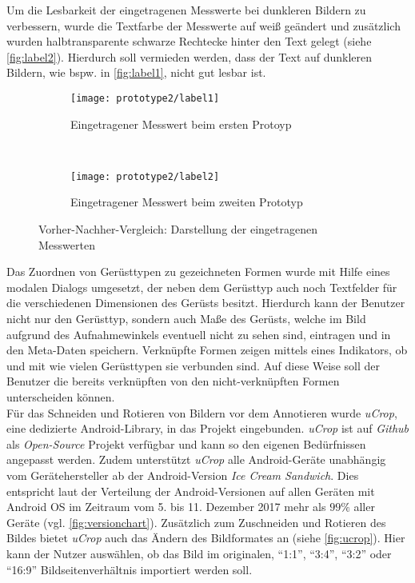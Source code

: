 Um die Lesbarkeit der eingetragenen Messwerte bei dunkleren Bildern zu verbessern, wurde die Textfarbe der Messwerte auf weiß geändert und zusätzlich wurden halbtransparente schwarze Rechtecke hinter den Text gelegt (siehe \autoref{fig:label2}).
Hierdurch soll vermieden werden, dass der Text auf dunkleren Bildern, wie bspw. in \autoref{fig:label1}, nicht gut lesbar ist.
\begin{figure}[h]
  \begin{subfigure}[t]{0.4\textwidth}
    \centering
    \texttt{[image: prototype2/label1]}
    \caption{Eingetragener Messwert beim ersten Protoyp}
    \label{fig:label1}
  \end{subfigure}
  ~
  \begin{subfigure}[t]{0.4\textwidth}
    \centering
    \texttt{[image: prototype2/label2]}
    \caption{Eingetragener Messwert beim zweiten Prototyp}
    \label{fig:label2}
  \end{subfigure}
  \centering
  \caption{Vorher-Nachher-Vergleich: Darstellung der eingetragenen Messwerten}
  \label{fig:labels}
\end{figure}

Das Zuordnen von Gerüsttypen zu gezeichneten Formen wurde mit Hilfe eines modalen Dialogs umgesetzt, der neben dem Gerüsttyp auch noch Textfelder für die verschiedenen Dimensionen des Gerüsts besitzt.
Hierdurch kann der Benutzer nicht nur den Gerüsttyp, sondern auch Maße des Gerüsts, welche im Bild aufgrund des Aufnahmewinkels eventuell nicht zu sehen sind, eintragen und in den Meta-Daten speichern.
Verknüpfte Formen zeigen mittels eines Indikators, ob und mit wie vielen Gerüsttypen sie verbunden sind.
Auf diese Weise soll der Benutzer die bereits verknüpften von den nicht-verknüpften Formen unterscheiden können. \\

Für das Schneiden und Rotieren von Bildern vor dem Annotieren wurde \emph{uCrop}, eine dedizierte Android-Library, in das Projekt eingebunden.
\emph{uCrop} ist auf \emph{Github} als \emph{Open-Source} Projekt verfügbar und kann so den eigenen Bedürfnissen angepasst werden. 
Zudem unterstützt \emph{uCrop} alle Android-Geräte unabhängig vom Gerätehersteller ab der Android-Version \emph{Ice Cream Sandwich}. 
Dies entspricht laut der Verteilung der Android-Versionen auf allen Geräten mit Android OS im Zeitraum vom 5. bis 11. Dezember 2017 mehr als $99\%$ aller Geräte (vgl. \autoref{fig:versionchart}).
Zusätzlich zum Zuschneiden und Rotieren des Bildes bietet \emph{uCrop} auch das Ändern des Bildformates an (siehe \autoref{fig:ucrop}).
Hier kann der Nutzer auswählen, ob das Bild im originalen, ``1:1'', ``3:4'', ``3:2'' oder ``16:9'' Bildseitenverhältnis importiert werden soll.

